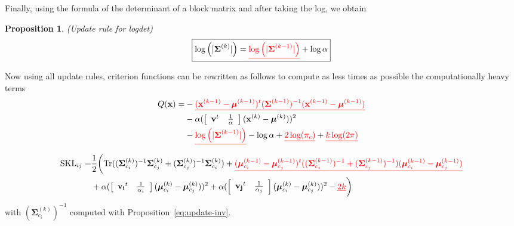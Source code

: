 \documentclass[a4paper,11pt,DIV=16,abstracton]{scrartcl}
\newcommand*{\equl}[2]{%
    \textcolor{#1}{\underline{#2}}%
}
\newtheorem{prop}{Proposition}
\begin{document}
        Finally, using the formula of the determinant of a block matrix and after taking the log, we obtain
        \begin{prop}
        \label{eq:update-log}
            (Update rule for logdet)
            \begin{equation*}
                \fbox{$\log \left(|\boldsymbol{\Sigma}^{(k)}|\right) = \equl{red}{\log \left(|\boldsymbol{\Sigma}^{(k-1)}|\right)} + \log \alpha$}
            \end{equation*}
        \end{prop}

        Now using all update rules, criterion functions can be rewritten  as follows to compute as less times as possible the computationally heavy terms
        \begin{align*}
            Q(\mathbf{x}) = &- \equl{red}{(\mathbf{x}^{(k-1)} - \boldsymbol{\mu}^{(k-1)})^t (\boldsymbol{\Sigma}^{(k-1)})^{-1} (\mathbf{x}^{(k-1)} - \boldsymbol{\mu}^{(k-1)})} \\
            &- \alpha ( \left[\begin{array}{cc} \mathbf{v}^t & \frac{1}{\alpha} \end{array}\right] (\mathbf{x}^{(k)} - \boldsymbol{\mu}^{(k)}) )^2 \\
            &- \equl{red}{\log \left(|\boldsymbol{\Sigma}^{(k-1)}|\right)} - \log \alpha  + \equl{red}{2 \log (\pi_c)} + \equl{red}{k \log(2 \pi)}
        \end{align*}

        \begin{align*}
            \text{SKL}_{ij} = &\frac{1}{2} \biggl( \text{Tr} ((\boldsymbol{\Sigma}_{c_i}^{(k)})^{-1} \boldsymbol{\Sigma}_{c_j}^{(k)} + (\boldsymbol{\Sigma}_{c_j}^{(k)})^{-1} \boldsymbol{\Sigma}_{c_i}^{(k)})
            + \equl{red}{(\boldsymbol{\mu}_{c_i}^{(k-1)} - \boldsymbol{\mu}_{c_j}^{(k-1)})^t ((\boldsymbol{\Sigma}_{c_i}^{(k-1)})^{-1} + (\boldsymbol{\Sigma}_{c_j}^{(k-1)})^{-1}) (\boldsymbol{\mu}_{c_i}^{(k-1)} - \boldsymbol{\mu}_{c_j}^{(k-1)})} \\
            &+ \alpha ( \left[\begin{array}{cc} \mathbf{v_i}^t & \frac{1}{\alpha_i} \end{array}\right] (\boldsymbol{\mu}_{c_i}^{(k)} - \boldsymbol{\mu}_{c_j}^{(k)}) )^2
            + \alpha ( \left[\begin{array}{cc} \mathbf{v_j}^t & \frac{1}{\alpha_j} \end{array}\right] (\boldsymbol{\mu}_{c_i}^{(k)} - \boldsymbol{\mu}_{c_j}^{(k)}) )^2
            - \equl{red}{2k} \biggr)
        \end{align*}
        with $(\boldsymbol{\Sigma}_{c_i}^{(k)})^{-1}$ computed with Proposition~\ref{eq:update-inv}.
\end{document}
